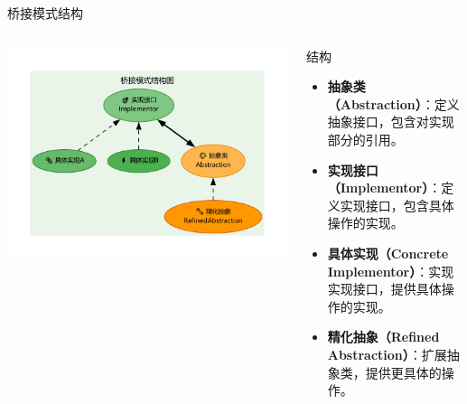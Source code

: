\documentclass[UTF8,aspectratio=169]{beamer}
\begin{document}
\begin{frame}{桥接模式结构}
    \begin{columns}
        \begin{column}{0.48\textwidth}
        \includegraphics[width=1.0\textwidth]{images/bridge_pattern.pdf}
        \end{column}
        \begin{column}{0.48\textwidth}
            \begin{ytublock}{结构}
                \begin{itemize}
                    \item \textbf{抽象类（Abstraction）}：定义抽象接口，包含对实现部分的引用。
                    \item \textbf{实现接口（Implementor）}：定义实现接口，包含具体操作的实现。
                    \item \textbf{具体实现（Concrete Implementor）}：实现实现接口，提供具体操作的实现。
                    \item \textbf{精化抽象（Refined Abstraction）}：扩展抽象类，提供更具体的操作。
                \end{itemize}
            \end{ytublock}
        \end{column}
    \end{columns}
\end{frame}
\end{document}
